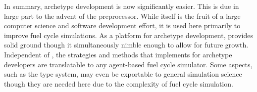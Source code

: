 In summary, archetype development is now significantly easier. This is due in large
part to the advent of the \cyclus preprocessor. While \cycpp itself is the fruit of
a large computer science and software development effort, it is used here 
primarily to improve fuel cycle simulations. As a platform for archetype
development, \cyclus provides solid ground though it simultaneously nimble enough
to allow for future growth. Independent of \cyclus, the strategies and methods that
\cyclus implements for archetype developers are translatable to any agent-based 
fuel cycle simulator.  Some aspects, such as the type system,  may even be exportable 
to general simulation science though they are needed here due to the complexity of 
fuel cycle simulation.

